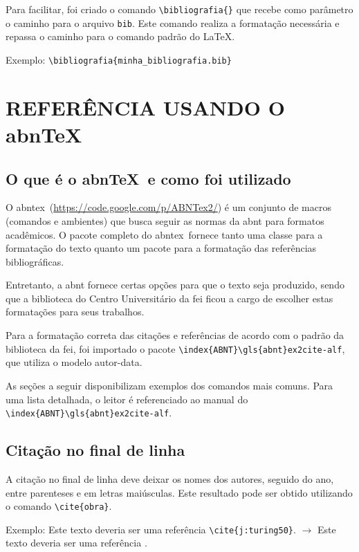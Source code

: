 \documentclass{fei}
\begin{document}
    Para facilitar, foi criado o comando \verb+\bibliografia{}+ que recebe como parâmetro o caminho para o arquivo \texttt{bib}. Este comando realiza a formatação necessária e repassa o caminho para o comando \verb++ padrão do \index{\LaTeX}\LaTeX.

    Exemplo: \verb+\bibliografia{minha_bibliografia.bib}+

\chapter{REFERÊNCIA USANDO O abn\TeX}\label{chap:referencia}

    \section{O que é o abn\TeX~e como foi utilizado}

    O \gls{abntex}~(\url{https://code.google.com/p/ABNTex2/}) é um conjunto de macros (comandos e ambientes) que busca seguir as normas da \gls{abnt} para formatos acadêmicos. O pacote completo do \gls{abntex}~fornece tanto uma classe para a formatação do texto quanto um pacote para a formatação das referências bibliográficas.

    Entretanto, a \gls{abnt} fornece certas opções para que o texto seja produzido, sendo que a biblioteca do Centro Universitário da \gls{fei} ficou a cargo de escolher estas formatações para seus trabalhos.

    Para a formatação correta das citações e referências de acordo com o padrão da biblioteca da \gls{fei}, foi importado o pacote \verb+\index{ABNT}\gls{abnt}ex2cite-alf+, que utiliza o modelo autor-data.

    As seções a seguir disponibilizam exemplos dos comandos mais comuns. Para uma lista detalhada, o leitor é referenciado ao manual do \verb+\index{ABNT}\gls{abnt}ex2cite-alf+.

    \section{Citação no final de linha}
    A citação no final de linha deve deixar os nomes dos autores, seguido do ano, entre parenteses e em letras maiúsculas. Este resultado pode ser obtido utilizando o comando \verb+\cite{obra}+.

    Exemplo: Este texto deveria ser uma referência \verb+\cite{j:turing50}+. $\to$ Este texto deveria ser uma referência \cite{j:turing50}.
\end{document}
